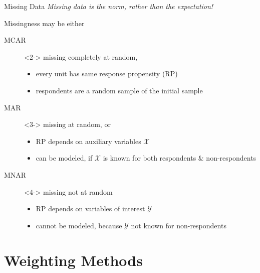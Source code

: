 \documentclass[10pt]{beamer}\usepackage[]{graphicx}\usepackage[]{color}
\begin{document}
\begin{frame}{Missing Data} 
\emph{Missing data is the norm, rather than the expectation!}

Missingness may be either
\begin{description} 
  \item[MCAR]<2-> missing completely at random,  
   \begin{itemize}
     \item every unit has same response propensity (RP)
     \item respondents are a random sample of the initial sample
   \end{itemize}
  \item[MAR]<3->  missing at random, or
   \begin{itemize}
     \item RP depends on auxiliary variables $\boldsymbol{\mathcal{X}}$
     \item can be modeled, if $\boldsymbol{\mathcal{X}}$ is known for both respondents \& non-respondents
   \end{itemize}
  \item[MNAR]<4-> missing not at random \vspace{2mm}
  \begin{itemize}
    \item RP depends on variables of interest $\mathcal{Y}$ 
    \item cannot be modeled, because $\mathcal{Y}$ not known for non-respondents
  \end{itemize}
\end{description}
\end{frame}



\section{Weighting Methods}
\end{document}
